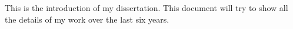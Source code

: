 This is the introduction of my dissertation. This document will try to show all the details of my work over the last six years.